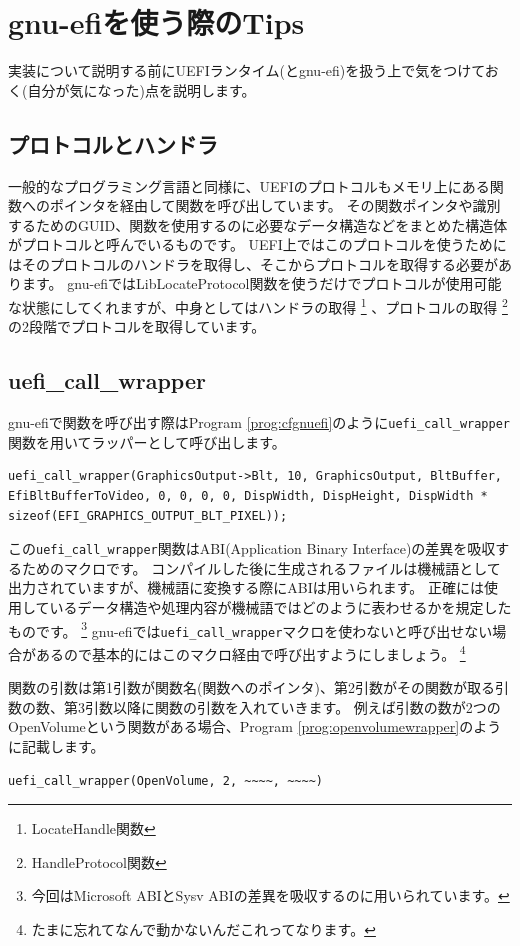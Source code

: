 \documentclass[10pt,b5paper,twoside,openany]{ltjsbook}
\begin{document}
\section{gnu-efiを使う際のTips}
実装について説明する前にUEFIランタイム(とgnu-efi)を扱う上で気をつけておく(自分が気になった)点を説明します。
\subsection{プロトコルとハンドラ}
一般的なプログラミング言語と同様に、UEFIのプロトコルもメモリ上にある関数へのポインタを経由して関数を呼び出しています。
その関数ポインタや識別するためのGUID、関数を使用するのに必要なデータ構造などをまとめた構造体がプロトコルと呼んでいるものです。
UEFI上ではこのプロトコルを使うためにはそのプロトコルのハンドラを取得し、そこからプロトコルを取得する必要があります。
gnu-efiではLibLocateProtocol関数を使うだけでプロトコルが使用可能な状態にしてくれますが、中身としてはハンドラの取得
\footnote{LocateHandle関数}
、プロトコルの取得
\footnote{HandleProtocol関数}
の2段階でプロトコルを取得しています。

\subsection{uefi\_call\_wrapper}
gnu-efiで関数を呼び出す際はProgram \ref{prog:cfgnuefi}のように\verb+uefi_call_wrapper+関数を用いてラッパーとして呼び出します。
\begin{lstlisting}[style=customC,caption=call function with gnu-efi,label=prog:cfgnuefi]
uefi_call_wrapper(GraphicsOutput->Blt, 10, GraphicsOutput, BltBuffer, EfiBltBufferToVideo, 0, 0, 0, 0, DispWidth, DispHeight, DispWidth * sizeof(EFI_GRAPHICS_OUTPUT_BLT_PIXEL));
\end{lstlisting}
この\verb+uefi_call_wrapper+関数はABI(Application Binary Interface)の差異を吸収するためのマクロです。
コンパイルした後に生成されるファイルは機械語として出力されていますが、機械語に変換する際にABIは用いられます。
正確には使用しているデータ構造や処理内容が機械語ではどのように表わせるかを規定したものです。
\footnote{今回はMicrosoft ABIとSysv ABIの差異を吸収するのに用いられています。}
gnu-efiでは\verb+uefi_call_wrapper+マクロを使わないと呼び出せない場合があるので基本的にはこのマクロ経由で呼び出すようにしましょう。
\footnote{たまに忘れてなんで動かないんだこれってなります。}

関数の引数は第1引数が関数名(関数へのポインタ)、第2引数がその関数が取る引数の数、第3引数以降に関数の引数を入れていきます。
例えば引数の数が2つのOpenVolumeという関数がある場合、Program \ref{prog:openvolumewrapper}のように記載します。
\begin{lstlisting}[style=customC,caption=OpenVolume with uefi\_call\_wrapper,label=prog:openvolumewrapper]
uefi_call_wrapper(OpenVolume, 2, ~~~~, ~~~~)
\end{lstlisting}
\end{document}

